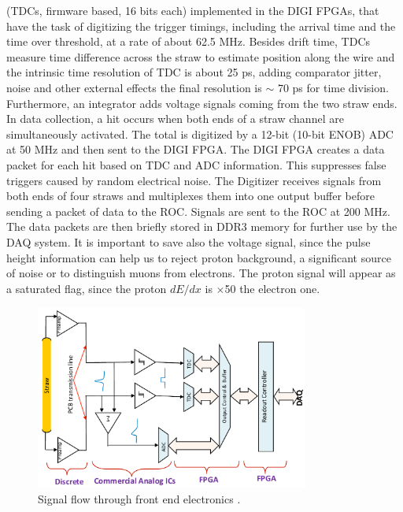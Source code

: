 (TDCs, firmware based, 16 bits each) implemented in the DIGI FPGAs, that have the task 
of digitizing the trigger timings, including the arrival time and the time over threshold, 
at a rate of about 62.5 MHz. Besides drift time, TDCs measure time difference across the 
straw to estimate position along the wire and the intrinsic time resolution of TDC is about 
25 ps, adding comparator jitter, noise and other external effects the final resolution is 
$\sim$ 70 ps for time division. Furthermore, an integrator adds voltage signals coming 
from the two straw ends. In data collection, a hit occurs when both ends of a straw channel 
are simultaneously activated. The total is digitized by a 12-bit (10-bit ENOB) ADC at 50 MHz 
and then sent to the DIGI FPGA. The DIGI FPGA creates a data packet for each hit based on 
TDC and ADC information. This suppresses false triggers caused by random electrical noise. 
The Digitizer receives signals from both ends of four straws and multiplexes them into one 
output buffer before sending a packet of data to the ROC. Signals are sent to the ROC at 
200 MHz. The data packets are then briefly stored in DDR3 memory for further use by the 
DAQ system. It is important to save also the voltage signal, since the pulse height 
information can help us to reject proton background, a significant source of noise 
or to distinguish muons from electrons. The proton signal will appear as a saturated flag, 
since the proton $dE/dx$ is $\times$50 the electron one.
\begin{figure}[!h]
\centering
\includegraphics[width =0.8\textwidth]{figures/png/Screenshot_20240203_135048.png}
\caption{Signal flow through front end electronics \cite{bartoszek2015mu2e}.}
\label{fig:flowfee}
\end{figure}

